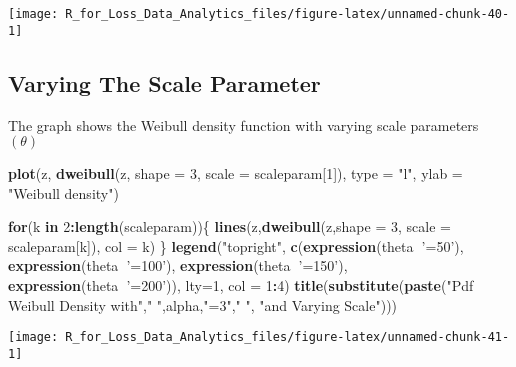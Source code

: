 \documentclass[]{book}
\newenvironment{Shaded}{\begin{snugshade}}{\end{snugshade}}
\newcommand{\KeywordTok}[1]{\textcolor[rgb]{0.13,0.29,0.53}{\textbf{#1}}}
\newcommand{\DataTypeTok}[1]{\textcolor[rgb]{0.13,0.29,0.53}{#1}}
\newcommand{\DecValTok}[1]{\textcolor[rgb]{0.00,0.00,0.81}{#1}}
\newcommand{\StringTok}[1]{\textcolor[rgb]{0.31,0.60,0.02}{#1}}
\newcommand{\ControlFlowTok}[1]{\textcolor[rgb]{0.13,0.29,0.53}{\textbf{#1}}}
\newcommand{\OperatorTok}[1]{\textcolor[rgb]{0.81,0.36,0.00}{\textbf{#1}}}
\newcommand{\NormalTok}[1]{#1}
\theoremstyle{definition}
\theoremstyle{definition}
\theoremstyle{definition}
\theoremstyle{remark}
\begin{document}
\begin{center}\texttt{[image: R\_for\_Loss\_Data\_Analytics\_files/figure-latex/unnamed-chunk-40-1]} \end{center}

\subsection{Varying The Scale
Parameter}\label{varying-the-scale-parameter-2}

The graph shows the Weibull density function with varying scale
parameters \((\theta)\)

\begin{Shaded}
\begin{Highlighting}[]
\KeywordTok{plot}\NormalTok{(z, }\KeywordTok{dweibull}\NormalTok{(z, }\DataTypeTok{shape =} \DecValTok{3}\NormalTok{, }\DataTypeTok{scale =}\NormalTok{ scaleparam[}\DecValTok{1}\NormalTok{]), }\DataTypeTok{type =} \StringTok{"l"}\NormalTok{, }\DataTypeTok{ylab =} \StringTok{"Weibull density"}\NormalTok{)}

\ControlFlowTok{for}\NormalTok{(k }\ControlFlowTok{in} \DecValTok{2}\OperatorTok{:}\KeywordTok{length}\NormalTok{(scaleparam))\{}
  \KeywordTok{lines}\NormalTok{(z,}\KeywordTok{dweibull}\NormalTok{(z,}\DataTypeTok{shape =} \DecValTok{3}\NormalTok{, }\DataTypeTok{scale =}\NormalTok{ scaleparam[k]), }\DataTypeTok{col =}\NormalTok{ k)}
\NormalTok{\}}
\KeywordTok{legend}\NormalTok{(}\StringTok{"topright"}\NormalTok{, }\KeywordTok{c}\NormalTok{(}\KeywordTok{expression}\NormalTok{(theta}\OperatorTok{~}\StringTok{'=50'}\NormalTok{), }\KeywordTok{expression}\NormalTok{(theta}\OperatorTok{~}\StringTok{'=100'}\NormalTok{), }\KeywordTok{expression}\NormalTok{(theta}\OperatorTok{~}\StringTok{'=150'}\NormalTok{), }\KeywordTok{expression}\NormalTok{(theta}\OperatorTok{~}\StringTok{'=200'}\NormalTok{)), }\DataTypeTok{lty=}\DecValTok{1}\NormalTok{, }\DataTypeTok{col =} \DecValTok{1}\OperatorTok{:}\DecValTok{4}\NormalTok{)}
\KeywordTok{title}\NormalTok{(}\KeywordTok{substitute}\NormalTok{(}\KeywordTok{paste}\NormalTok{(}\StringTok{"Pdf Weibull Density with"}\NormalTok{,}\StringTok{" "}\NormalTok{,alpha,}\StringTok{"=3"}\NormalTok{,}\StringTok{" "}\NormalTok{, }\StringTok{"and Varying Scale"}\NormalTok{)))}
\end{Highlighting}
\end{Shaded}

\begin{center}\texttt{[image: R\_for\_Loss\_Data\_Analytics\_files/figure-latex/unnamed-chunk-41-1]} \end{center}
\end{document}
